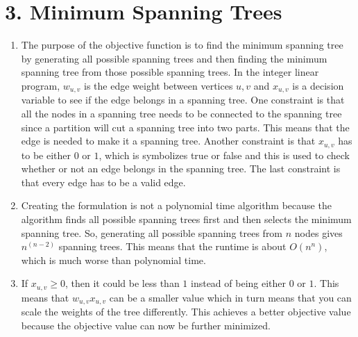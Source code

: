 \documentclass[11pt]{article}
\begin{document}
\section*{3. Minimum Spanning Trees}
\begin{enumerate}[label=(\alph*)]
\item
The purpose of the objective function is to find the minimum spanning tree by generating all possible spanning trees and then finding the minimum spanning tree from those possible spanning trees. In the integer linear program, $w_{u, v}$ is the edge weight between vertices $u, v$ and $x_{u, v}$ is a decision variable to see if the edge belongs in a spanning tree. One constraint is that all the nodes in a spanning tree needs to be connected to the spanning tree since a partition will cut a spanning tree into two parts. This means that the edge is needed to make it a spanning tree. Another constraint is that $x_{u, v}$ has to be either $0$ or $1$, which is symbolizes true or false and this is used to check whether or not an edge belongs in the spanning tree. The last constraint is that every edge has to be a valid edge.



\item
Creating the formulation is not a polynomial time algorithm because the algorithm finds all possible spanning trees first and then selects the minimum spanning tree. So, generating all possible spanning trees from $n$ nodes gives $n^{(n - 2)}$ spanning trees. This means that the runtime is about $O(n^n)$, which is much worse than polynomial time.



\item
If $x_{u, v} \geq 0$, then it could be less than $1$ instead of being either $0$ or $1$. This means that $w_{u, v} x_{u, v}$ can be a smaller value which in turn means that you can scale the weights of the tree differently. This achieves a better objective value because the objective value can now be further minimized.
\end{enumerate}



\newpage
\end{document}
